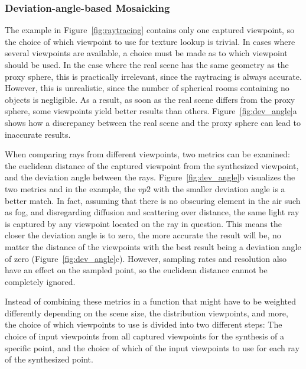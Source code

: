 

\subsubsection{Deviation-angle-based Mosaicking}
The example in Figure~\ref{fig:raytracing} contains only one captured viewpoint, so the choice of which viewpoint to use for texture lookup is trivial. In cases where several viewpoints are available, a choice must be made as to which viewpoint should be used. In the case where the real scene has the same geometry as the proxy sphere, this is practically irrelevant, since the raytracing is always accurate. However, this is unrealistic, since the number of spherical rooms containing no objects is negligible. As a result, as soon as the real scene differs from the proxy sphere, some viewpoints yield better results than others. Figure~\ref{fig:dev_angle}a shows how a discrepancy between the real scene and the proxy sphere can lead to inaccurate results.

When comparing rays from different viewpoints, two metrics can be examined: the euclidean distance of the captured viewpoint from the synthesized viewpoint, and the deviation angle between the rays. Figure~\ref{fig:dev_angle}b visualizes the two metrics and in the example, the $vp2$ with the smaller deviation angle is a better match. In fact, assuming that there is no obscuring element in the air such as fog, and disregarding diffusion and scattering over distance, the same light ray is captured by any viewpoint located on the ray in question. This means the closer the deviation angle is to zero, the more accurate the result will be, no matter the distance of the viewpoints with the best result being a deviation angle of zero (Figure~\ref{fig:dev_angle}c). However, sampling rates and resolution also have an effect on the sampled point, so the euclidean distance cannot be completely ignored.

Instead of combining these metrics in a function that might have to be weighted differently depending on the scene size, the distribution viewpoints, and more, the choice of which viewpoints to use is divided into two different steps: The choice of input viewpoints from all captured viewpoints for the synthesis of a specific point, and the choice of which of the input viewpoints to use for each ray of the synthesized point. 

